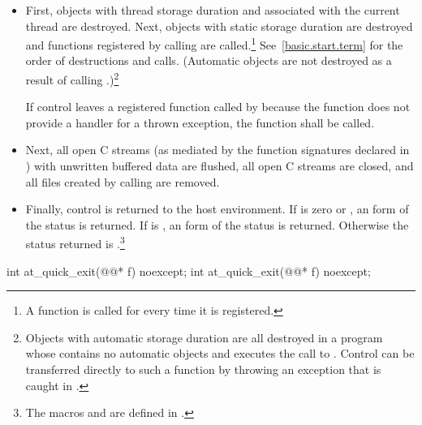 \begin{itemdescr}
\pnum
\effects
\begin{itemize}
\item
First, objects with thread storage duration and associated with the current thread
are destroyed. Next, objects with static storage duration are destroyed
and functions registered by calling
are called.\footnote{A function is called for every time it is registered.}
See~\ref{basic.start.term} for the order of destructions and calls.
(Automatic objects are not destroyed as a result of calling
.)\footnote{Objects with automatic storage duration are all destroyed in a program whose
contains no automatic objects and executes the call to
.
Control can be transferred directly to such a
 function
by throwing an exception that is caught in
.}

If control leaves a registered function called by  because the function does
not provide a handler for a thrown exception, the function  shall be called.%
%

\item
Next, all open C streams (as mediated by the function
signatures declared in
)
with unwritten buffered data are flushed, all open C
streams are closed, and all files created by calling
are removed.

\item
Finally, control is returned to the host environment.
If  is zero or
,
an 
form of the status
is returned.
If  is
,
an  form of the status
is returned.
Otherwise the status returned is .\footnote{The macros
and
are defined in
.}
\end{itemize}
\end{itemdescr}

%
\begin{itemdecl}
int at_quick_exit(@@* f) noexcept;
int at_quick_exit(@@* f) noexcept;
\end{itemdecl}

